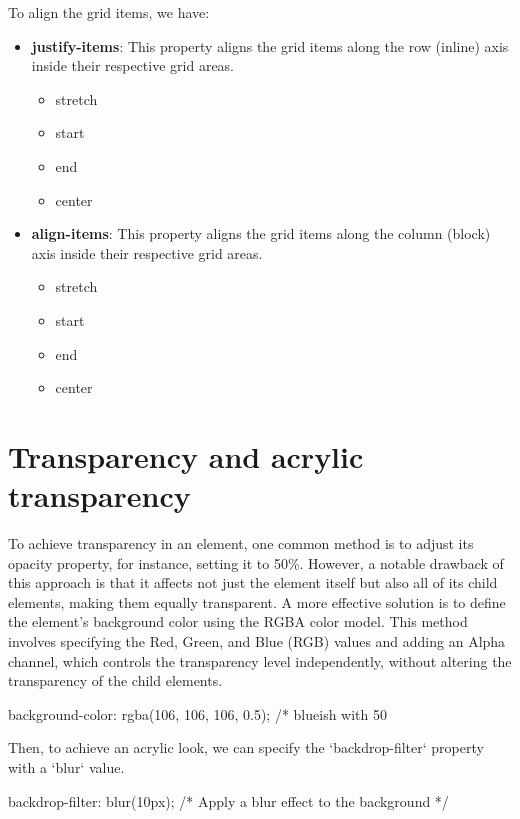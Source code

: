 \documentclass{report}
\begin{document}
    \bigbreak \noindent 
    To align the grid items, we have:
    \begin{itemize}
        \item \textbf{justify-items}: This property aligns the grid items along the row (inline) axis inside their respective grid areas.
            \begin{itemize}
                \item stretch
                \item start
                \item end
                \item center
            \end{itemize}
        \item \textbf{align-items}: This property aligns the grid items along the column (block) axis inside their respective grid areas.
            \begin{itemize}
                \item stretch
                \item start
                \item end
                \item center
            \end{itemize}
    \end{itemize}

    \bigbreak \noindent 

    \pagebreak \bigbreak \noindent 
    \section{\LARGE Transparency and acrylic transparency}
    \bigbreak \noindent 
    To achieve transparency in an element, one common method is to adjust its opacity property, for instance, setting it to 50\%. However, a notable drawback of this approach is that it affects not just the element itself but also all of its child elements, making them equally transparent. A more effective solution is to define the element's background color using the RGBA color model. This method involves specifying the Red, Green, and Blue (RGB) values and adding an Alpha channel, which controls the transparency level independently, without altering the transparency of the child elements.
    \begin{concept}
        \bigbreak \noindent 
        \begin{csscode}
            background-color: rgba(106, 106, 106, 0.5); /* blueish with 50%
        \end{csscode}
    \end{concept}
    \bigbreak \noindent 
    Then, to achieve an acrylic look, we can specify the `backdrop-filter` property with a `blur` value.
    \bigbreak \noindent 
    \begin{csscode}
        backdrop-filter: blur(10px); /* Apply a blur effect to the background */
    \end{csscode}
    
\end{document}

